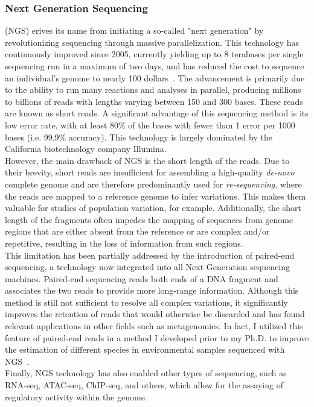 \subsubsection{Next Generation Sequencing} (\gls{NGS}) erives its name from initiating a so-called "next generation" by revolutionizing sequencing through massive parallelization. This technology has continuously improved since 2005, currently yielding up to 8 terabases per single sequencing run in a maximum of two days, and has reduced the cost to sequence an individual's genome to nearly 100 dollars~\cite{100dollars}. The advancement is primarily due to the ability to run many reactions and analyses in parallel, producing millions to billions of reads with lengths varying between 150 and 300 bases. These reads are known as short reads. A significant advantage of this sequencing method is its low error rate, with at least 80\% of the bases with fewer than 1 error per 1000 bases (i.e. 99.9\% accuracy). This technology is largely dominated by the California biotechnology company Illumina.\\
However, the main drawback of NGS is the short length of the reads. Due to their brevity, short reads are insufficient for assembling a high-quality \emph{de-novo} complete genome and are therefore predominantly used for \emph{re-sequencing}, where the reads are mapped to a reference genome to infer variations. This makes them valuable for studies of population variation, for example. Additionally, the short length of the fragments often impedes the mapping of sequences from genome regions that are either absent from the reference or are complex and/or repetitive, resulting in the loss of information from such regions.\\
This limitation has been partially addressed by the introduction of paired-end sequencing, a technology now integrated into all Next Generation sequencing machines. Paired-end sequencing reads both ends of a DNA fragment and associates the two reads to provide more long-range information. Although this method is still not sufficient to resolve all complex variations, it significantly improves the retention of reads that would otherwise be discarded and has found relevant applications in other fields such as metagenomics. In fact, I utilized this feature of paired-end reads in a method I developed prior to my Ph.D. to improve the estimation of different species in environmental samples sequenced with NGS~\cite{metaprob2}. \\
Finally, NGS technology has also enabled other types of sequencing, such as RNA-seq, ATAC-seq, ChIP-seq, and others, which allow for the assaying of regulatory activity within the genome.

